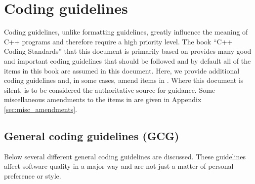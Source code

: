 %
\section{Coding guidelines}
\label{thyracodingguidelines:codingguidelines:sec}
%

Coding guidelines, unlike formatting guidelines, greatly influence the meaning
of C++ programs and therefore require a high priority level.  The book ``C++
Coding Standards'' {}\cite{C++CodingStandards05} that this document is
primarily based on provides many good and important coding guidelines that
should be followed and by default all of the items in this book are assumed in
this document.  Here, we provide additional coding guidelines and, in some
cases, amend items in {}\cite{C++CodingStandards05}.  Where this document is
silent, {}\cite{C++CodingStandards05} is to be considered the authoritative
source for guidance.  Some miscellaneous amendments to the items in
{}\cite{C++CodingStandards05} are given in Appendix
{}\ref{sec:misc_amendments}.

%
\subsection{General coding guidelines (GCG)}
%

Below several different general coding guidelines are discussed.  These
guidelines affect software quality in a major way and are not just a matter of
personal preference or style.

